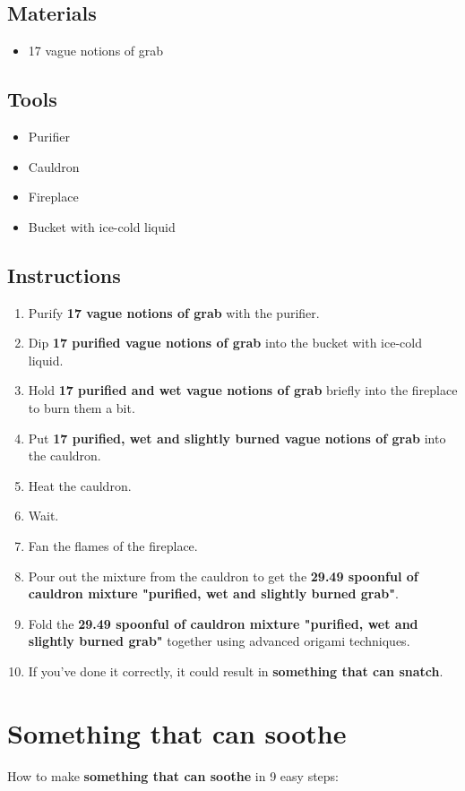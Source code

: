 \documentclass{article}
\begin{document}
\subsection{Materials}\begin{itemize}
\item 
17 vague notions of grab
\end{itemize}
\subsection{Tools}\begin{itemize}
\item 
Purifier
\item 
Cauldron
\item 
Fireplace
\item 
Bucket with ice-cold liquid
\end{itemize}
\subsection{Instructions}\begin{enumerate}
\item 
Purify \textbf{17 vague notions of grab} with the purifier.
\item 
Dip \textbf{17 purified vague notions of grab} into the bucket with ice-cold liquid.
\item 
Hold \textbf{17 purified and wet vague notions of grab} briefly into the fireplace to burn them a bit.
\item 
Put \textbf{17 purified, wet and slightly burned vague notions of grab} into the cauldron.
\item 
Heat the cauldron.
\item 
Wait.
\item 
Fan the flames of the fireplace.
\item 
Pour out the mixture from the cauldron to get the \textbf{29.49 spoonful of cauldron mixture "purified, wet and slightly burned grab"}.
\item 
Fold the \textbf{29.49 spoonful of cauldron mixture "purified, wet and slightly burned grab"} together using advanced origami techniques.
\item 
If you've done it correctly, it could result in \textbf{something that can snatch}.
\end{enumerate}
\newpage
\section{Something that can soothe}How to make \textbf{something that can soothe} in 9 easy steps:
\end{document}
